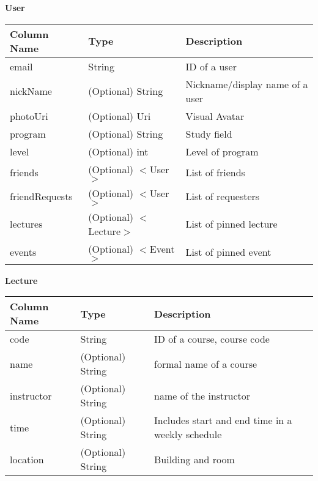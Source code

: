 \documentclass[12pt, titlepage]{article}
\begin{document}
\quad \textbf{User}
\begin{table}[H]
	\begin{tabular}{|p{}|p{}|p{}|}
		\hline
		\textbf{Column Name} & \textbf{Type}  & \textbf{Description}                  \\
		\hline
		email                   & String                & ID of a user                        \\
		\hline
		nickName           & (Optional) String                & Nickname/display name of a user      \\
		\hline
		photoUri           & (Optional) Uri                & Visual Avatar       \\
		\hline
		program            & (Optional) String                & Study field                \\
		\hline
		level             & (Optional) int                & Level of program                 \\
		\hline
		friends          &  (Optional) $<$User$>$                & List of friends \\
		\hline
		friendRequests          &  (Optional) $<$User$>$                & List of requesters              \\
		\hline
		lectures                & (Optional) $<$Lecture$>$                & List of pinned lecture                     \\
		\hline
		events                & (Optional) $<$Event$>$                & List of pinned event                     \\			
		\hline
\end{tabular}
\end{table}

\textbf{Lecture}
\begin{table}[H]
	\begin{tabular}{|p{}|p{}|p{}|}
		\hline
		\textbf{Column Name} & \textbf{Type}  & \textbf{Description}                  \\
		\hline
		code                   & String                & ID of a course, course code\\
		\hline
		name           & (Optional) String     & formal name of a course      \\
		\hline
		instructor           & (Optional) String      & name of the instructor       \\
		\hline
		time            & (Optional) String                & Includes start and end time in a weekly schedule  \\
		\hline
		location             & (Optional) String                & Building and room                 \\
		\hline
\end{tabular}
\end{table}
\end{document}
